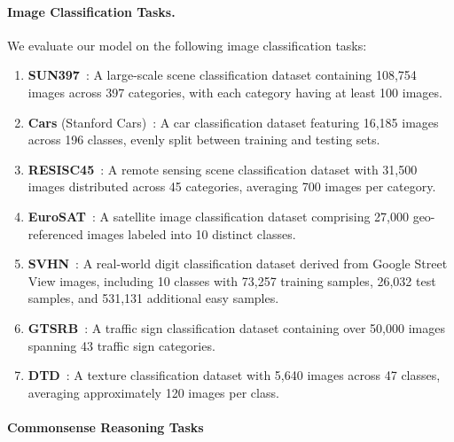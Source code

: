 \paragraph{Image Classification Tasks.}
We evaluate our model on the following image classification tasks:
\begin{enumerate}
    \item \textbf{SUN397}~\cite{xiao2016sun}: A large-scale scene classification dataset containing 108,754 images across 397 categories, with each category having at least 100 images.
    \item \textbf{Cars} (Stanford Cars)~\cite{krause20133d}: A car classification dataset featuring 16,185 images across 196 classes, evenly split between training and testing sets.
    \item \textbf{RESISC45}~\cite{cheng2017remote}: A remote sensing scene classification dataset with 31,500 images distributed across 45 categories, averaging 700 images per category.
    \item \textbf{EuroSAT}~\cite{helber2019eurosat}: A satellite image classification dataset comprising 27,000 geo-referenced images labeled into 10 distinct classes.
    \item \textbf{SVHN}~\cite{netzer2011reading}: A real-world digit classification dataset derived from Google Street View images, including 10 classes with 73,257 training samples, 26,032 test samples, and 531,131 additional easy samples.
    \item \textbf{GTSRB}~\cite{stallkamp2011german}: A traffic sign classification dataset containing over 50,000 images spanning 43 traffic sign categories.
    \item \textbf{DTD}~\cite{cimpoi2014describing}: A texture classification dataset with 5,640 images across 47 classes, averaging approximately 120 images per class.
\end{enumerate}

\paragraph{Commonsense Reasoning Tasks}

